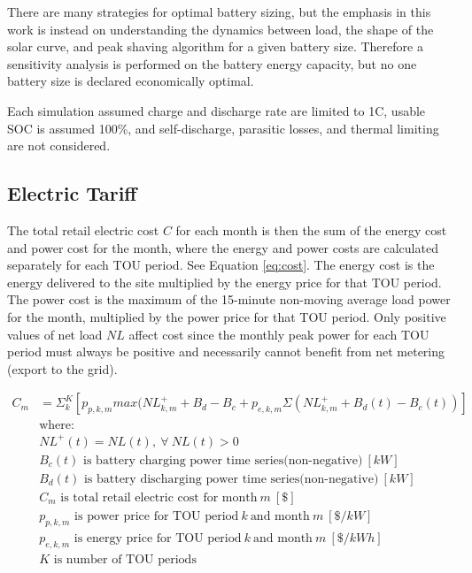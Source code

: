 \documentclass[journal,article,submit,pdftex,moreauthors]{Definitions/mdpi}
\begin{document}
There are many strategies for optimal battery sizing, but the emphasis in this work is instead on understanding the dynamics between load, the shape of the solar curve, and peak shaving algorithm for a given battery size. Therefore a sensitivity analysis is performed on the battery energy capacity, but no one battery size is declared economically optimal.

Each simulation assumed charge and discharge rate are limited to 1C, usable SOC is assumed 100\%, and self-discharge, parasitic losses, and thermal limiting are not considered.

\subsection{Electric Tariff}\label{electric-tariff}

The total retail electric cost \(C\) for each month is then the sum of the energy cost and power cost for the month, where the energy and power costs are calculated separately for each TOU period. See Equation \ref{eq:cost}. The energy cost is the energy delivered to the site multiplied by the energy price for that TOU period. The power cost is the maximum of the 15-minute non-moving average load power for the month, multiplied by the power price for that TOU period. Only positive values of net load \(NL\) affect cost since the monthly peak power for each TOU period must always be positive and necessarily cannot benefit from net metering (export to the grid).

\begin{equation}
  \label{eq:cost}
  \begin{split}
    C_m & = \Sigma_k^K [ p_{p,k,m} max(NL^+_{k,m} + B_d - B_c + p_{e,k,m} \Sigma (NL^+_{k,m} + B_d(t) - B_c(t)) ] \\
        & \text{where:}                                                                                           \\
        & NL^+(t) = NL(t),\ \forall\ NL(t)>0                                                                      \\
        & B_c(t) \text{ is battery charging power time series(non-negative)}\ [kW]                                \\
        & B_d(t) \text{ is battery discharging power time series(non-negative)}\ [kW]                             \\
        & C_m \text{ is total retail electric cost for month}\ m\ [\$]                                            \\
        & p_{p,k,m} \text{ is power price for TOU period}\ k\ \text{and month}\ m\  [\$/kW]                       \\
        & p_{e,k,m} \text{ is energy price for TOU period}\ k\ \text{and month}\ m\ [\$/kWh]                      \\
        & K \text{ is number of TOU periods}
  \end{split}
\end{equation}
\end{document}
